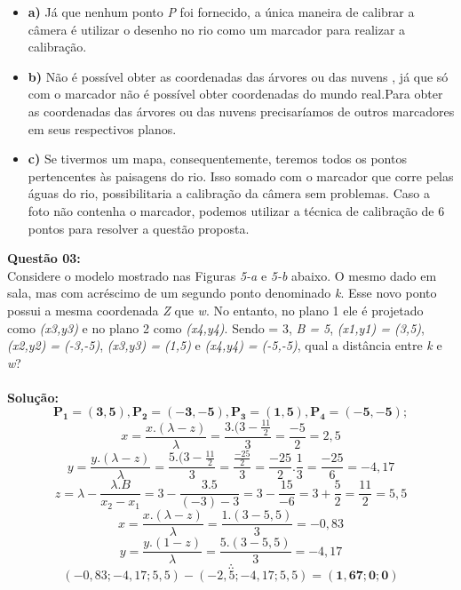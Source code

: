 \begin{itemize}
\item\textbf{a)}
Já que nenhum ponto \emph{P} foi fornecido, a única maneira de calibrar a câmera é utilizar o desenho no rio como um marcador para realizar a calibração.

\vspace{0.5cm}
\item\textbf{b)}
Não é possível obter as coordenadas das árvores ou das nuvens , já que só com o marcador não é possível obter coordenadas do mundo real.Para obter as coordenadas das árvores ou das nuvens precisaríamos de outros marcadores em seus respectivos planos.

\vspace{0.5cm}
\item\textbf{c)}
Se tivermos um mapa, consequentemente, teremos todos os pontos pertencentes às paisagens do rio. Isso somado com o marcador que corre pelas águas do rio, possibilitaria a calibração da câmera sem problemas. Caso a foto não contenha o marcador, podemos utilizar a técnica de calibração de 6 pontos para resolver a questão proposta.
\end{itemize}

\vspace{0.5 cm}
\noindent\textbf{Questão 03:}\\
Considere o modelo mostrado nas Figuras \emph{5-a} e \emph{5-b} abaixo. O mesmo dado em sala, mas com acréscimo de um segundo ponto denominado \emph{k}. Esse novo ponto possui a mesma coordenada \emph{Z} que \emph{w}. No entanto, no plano 1 ele é projetado como \emph{(x3,y3)} e no plano 2 como \emph{(x4,y4)}. Sendo \textlambda = 3, \emph{B = 5}, \emph{(x1,y1) = (3,5)}, \emph{(x2,y2) = (-3,-5)}, \emph{(x3,y3) = (1,5)} e \emph{(x4,y4) = (-5,-5)}, qual a distância entre \emph{k} e \emph{w}?\\
\\
\noindent\textbf{Solução:}
\[ \mathbf{P_{1} = (3,5), P_{2} = (-3, -5), P_{3} = (1,5), P_{4} = (-5, -5)}; \]
\vspace{0.2 cm}
\[ x = \frac{x.(\lambda - z)}{\lambda} = \frac{3.(3 - \frac{11}{2}}{3} = \frac{-5}{2} = 2,5 \]
\[ y = \frac{y.(\lambda - z)}{\lambda} = \frac{5.(3-\frac{11}{2}}{3} = \frac{\frac{-25}{2}}{3} = \frac{-25}{2} . \frac{1}{3} = \frac{-25}{6} = -4,17 \]
\[ z = \lambda - \frac{\lambda . B}{x_{2}-x_{1}} = 3 - \frac{3.5}{(-3)-3} = 3 - \frac{15}{-6} = 3 + \frac{5}{2} = \frac{11}{2} = 5,5 \]
\[ x = \frac{x.(\lambda - z)}{\lambda} = \frac{1.(3 - 5,5)}{3} = -0,83 \]
\[ y = \frac{y.(1-z)}{\lambda} = \frac{5.(3 - 5,5)}{3} = -4,17 \]
\[ \therefore \]
\[(-0,83; -4,17; 5,5) - (-2,5; -4,17; 5,5) = \mathbf{(1,67; 0; 0)} \]

